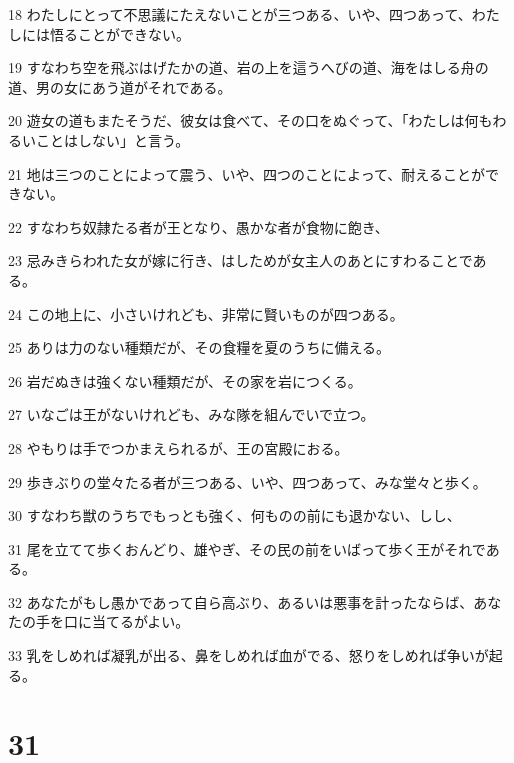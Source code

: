\par 18 わたしにとって不思議にたえないことが三つある、いや、四つあって、わたしには悟ることができない。
\par 19 すなわち空を飛ぶはげたかの道、岩の上を這うへびの道、海をはしる舟の道、男の女にあう道がそれである。
\par 20 遊女の道もまたそうだ、彼女は食べて、その口をぬぐって、「わたしは何もわるいことはしない」と言う。
\par 21 地は三つのことによって震う、いや、四つのことによって、耐えることができない。
\par 22 すなわち奴隷たる者が王となり、愚かな者が食物に飽き、
\par 23 忌みきらわれた女が嫁に行き、はしためが女主人のあとにすわることである。
\par 24 この地上に、小さいけれども、非常に賢いものが四つある。
\par 25 ありは力のない種類だが、その食糧を夏のうちに備える。
\par 26 岩だぬきは強くない種類だが、その家を岩につくる。
\par 27 いなごは王がないけれども、みな隊を組んでいで立つ。
\par 28 やもりは手でつかまえられるが、王の宮殿におる。
\par 29 歩きぶりの堂々たる者が三つある、いや、四つあって、みな堂々と歩く。
\par 30 すなわち獣のうちでもっとも強く、何ものの前にも退かない、しし、
\par 31 尾を立てて歩くおんどり、雄やぎ、その民の前をいばって歩く王がそれである。
\par 32 あなたがもし愚かであって自ら高ぶり、あるいは悪事を計ったならば、あなたの手を口に当てるがよい。
\par 33 乳をしめれば凝乳が出る、鼻をしめれば血がでる、怒りをしめれば争いが起る。

\chapter{31}

